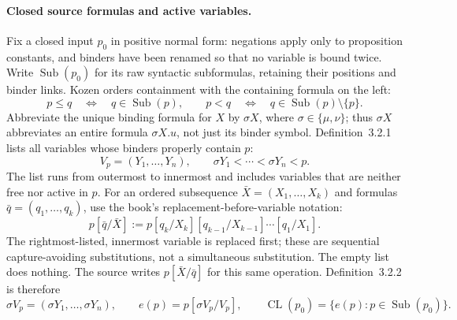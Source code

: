 \paragraph{Closed source formulas and active variables.}
Fix a closed input \(p_0\) in positive normal form: negations apply
only to proposition constants, and binders have been renamed so that
no variable is bound twice. Write \(\operatorname{Sub}(p_0)\) for its
raw syntactic subformulas, retaining their positions and binder links.
Kozen orders containment with the containing formula on the left:
\[
 p\leq q\quad\Longleftrightarrow\quad q\in\operatorname{Sub}(p),
 \qquad
 p<q\quad\Longleftrightarrow\quad
 q\in\operatorname{Sub}(p)\setminus\{p\}.
\]
Abbreviate the unique binding formula for \(X\) by \(\sigma X\),
where \(\sigma\in\{\mu,\nu\}\); thus \(\sigma X\) abbreviates
an entire formula \(\sigma X.u\), not just its binder symbol.
Definition~3.2.1 lists all variables whose binders properly contain \(p\):
\[
 V_p=(Y_1,\ldots,Y_n),\qquad
 \sigma Y_1<\cdots<\sigma Y_n<p.
\]
The list runs from outermost to innermost and includes variables
that are neither free nor active in \(p\). For an ordered subsequence
\(\bar X=(X_1,\ldots,X_k)\) and formulas
\(\bar q=(q_1,\ldots,q_k)\), use the book's
replacement-before-variable notation:
\[
 p[\bar q/\bar X]
   :=p[q_k/X_k][q_{k-1}/X_{k-1}]\cdots[q_1/X_1].
\]
The rightmost-listed, innermost variable is replaced first;
these are sequential capture-avoiding substitutions, not a simultaneous
substitution. The empty list does nothing. The source writes
\(p[\bar X/\bar q]\) for this same operation.
Definition~3.2.2 is therefore
\[
 \sigma V_p=(\sigma Y_1,\ldots,\sigma Y_n),\qquad
 e(p)=p[\sigma V_p/V_p],\qquad
 \operatorname{CL}(p_0)=\{e(p):p\in\operatorname{Sub}(p_0)\}.
\]

